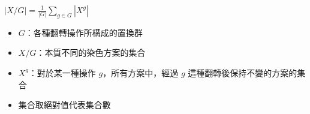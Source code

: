 $|X/G| = \frac{1}{|G|} \sum_{g\in G} |X^g|$
\begin{itemize}
    \item $G$：各種翻轉操作所構成的置換群
    \item $X/G$：本質不同的染色方案的集合
    \item $X^g$：對於某一種操作 $g$，所有方案中，經過 $g$ 這種翻轉後保持不變的方案的集合
    \item 集合取絕對值代表集合數
\end{itemize}